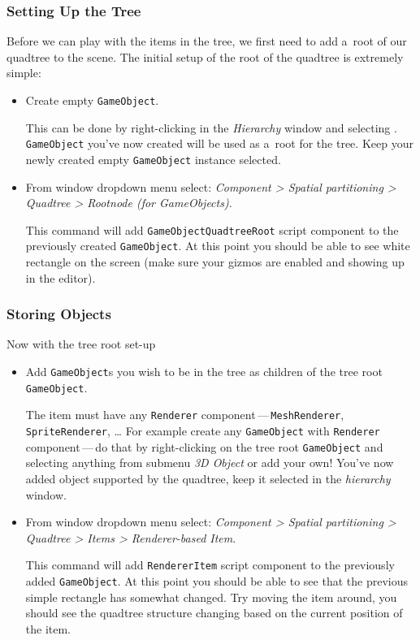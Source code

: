 \documentclass{article}
\begin{document}
\subsubsection{Setting Up the Tree} \label{usage:editor:setup}
Before we can play with the items in the tree, we first need to add a~root of our quadtree to the scene.
The initial setup of the root of the quadtree is extremely simple:
\begin{itemize}
    \item Create empty \texttt{GameObject}.
    
    This can be done by right-clicking in the \textit{Hierarchy} window and selecting .
    \texttt{GameObject} you've now created will be used as a~root for the tree.
    Keep your newly created empty \texttt{GameObject} instance selected.
    
    \item From window dropdown menu select: \textit{Component > Spatial partitioning > Quadtree > Rootnode (for GameObjects)}.
    
    This command will add \texttt{GameObjectQuadtreeRoot} script component to the previously created \texttt{GameObject}.
    At this point you should be able to see white rectangle on the screen (make sure your gizmos are enabled and showing up in the editor).
\end{itemize}

\subsubsection{Storing Objects} \label{usage:editor:store}
Now with the tree root set-up 
\begin{itemize}
    \item Add \texttt{GameObject}s you wish to be in the tree as children of the tree root \texttt{GameObject}.
    
    The item must have any \texttt{Renderer} component\,---\,\texttt{MeshRenderer}, \texttt{SpriteRenderer}, \dots
    For example create any \texttt{GameObject} with \texttt{Renderer} component\,---\,do that by right-clicking on the tree root \texttt{GameObject} and selecting anything from submenu \textit{3D Object} or add your own!
    You've now added object supported by the quadtree, keep it selected in the \textit{hierarchy} window.
    
    \item From window dropdown menu select: \textit{Component > Spatial partitioning > Quadtree > Items > Renderer-based Item}.
    
    This command will add \texttt{RendererItem} script component to the previously added \texttt{GameObject}.
    At this point you should be able to see that the previous simple rectangle has somewhat changed.
    Try moving the item around, you should see the quadtree structure changing based on the current position of the item.
\end{itemize}
\end{document}
